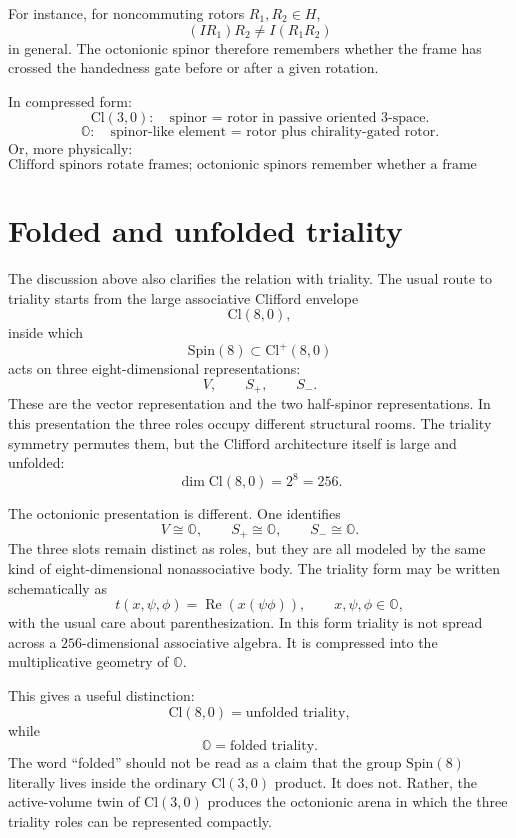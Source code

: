 \documentclass[11pt]{article}
\newcommand{\Cl}{\mathrm{Cl}}
\newcommand{\OO}{\mathbb O}
\begin{document}
For instance, for noncommuting rotors $R_1,R_2\in H$,
\[
(IR_1)R_2\neq I(R_1R_2)
\]
in general. The octonionic spinor therefore remembers whether the frame has
crossed the handedness gate before or after a given rotation.

In compressed form:
\[
\boxed{
\Cl(3,0):\quad \text{spinor = rotor in passive oriented 3-space.}
}
\]
\[
\boxed{
\OO:\quad \text{spinor-like element = rotor plus chirality-gated rotor.}
}
\]
Or, more physically:
\[
\boxed{
\text{Clifford spinors rotate frames; octonionic spinors remember whether a frame crossed the handedness gate.}
}
\]



\section{Folded and unfolded triality}

The discussion above also clarifies the relation with triality. The usual
route to triality starts from the large associative Clifford envelope
\[
\Cl(8,0),
\]
inside which
\[
\mathrm{Spin}(8)\subset \Cl^+(8,0)
\]
acts on three eight-dimensional representations:
\[
V,
\qquad
S_+,
\qquad
S_-.
\]
These are the vector representation and the two half-spinor representations.
In this presentation the three roles occupy different structural rooms. The
triality symmetry permutes them, but the Clifford architecture itself is large
and unfolded:
\[
\dim \Cl(8,0)=2^8=256.
\]

The octonionic presentation is different. One identifies
\[
V\cong \mathbb O,
\qquad
S_+\cong \mathbb O,
\qquad
S_-\cong \mathbb O.
\]
The three slots remain distinct as roles, but they are all modeled by the same
kind of eight-dimensional nonassociative body. The triality form may be written
schematically as
\[
t(x,\psi,\phi)=\operatorname{Re}(x(\psi\phi)),
\qquad
x,\psi,\phi\in\mathbb O,
\]
with the usual care about parenthesization. In this form triality is not spread
across a $256$-dimensional associative algebra. It is compressed into the
multiplicative geometry of $\mathbb O$.

This gives a useful distinction:
\[
\Cl(8,0)=\text{unfolded triality},
\]
while
\[
\mathbb O=\text{folded triality}.
\]
The word ``folded'' should not be read as a claim that the group
$\mathrm{Spin}(8)$ literally lives inside the ordinary $\Cl(3,0)$ product. It
does not. Rather, the active-volume twin of $\Cl(3,0)$ produces the octonionic
arena in which the three triality roles can be represented compactly.
\end{document}
